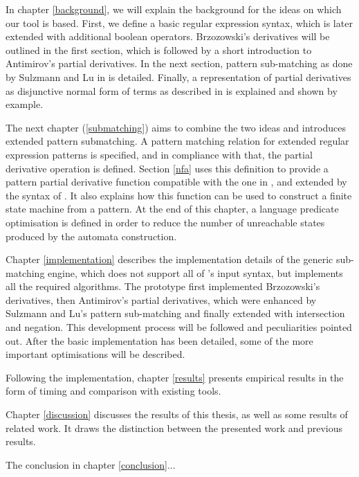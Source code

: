 In chapter \ref{background}, we will explain the background for the ideas on
which our tool is based. First, we define a basic regular expression syntax,
which is later extended with additional boolean operators. Brzozowski's
derivatives will be outlined in the first section, which is followed by a short
introduction to Antimirov's partial derivatives. In the next section, pattern
sub-matching as done by Sulzmann and Lu in \cite{pdpat} is detailed. Finally, a
representation of partial derivatives as disjunctive normal form of terms as
described in \cite{pdere} is explained and shown by example.

The next chapter (\ref{submatching}) aims to combine the two ideas and
introduces extended pattern submatching. A pattern matching relation for
extended regular expression patterns is specified, and in compliance with that,
the partial derivative operation is defined. Section \ref{nfa} uses this
definition to provide a pattern partial derivative function compatible with the
one in \cite{pdpat}, and extended by the syntax of \cite{pdere}. It also
explains how this function can be used to construct a finite state machine from
a pattern. At the end of this chapter, a language predicate optimisation is
defined in order to reduce the number of unreachable states produced by the
automata construction.

Chapter \ref{implementation} describes the implementation details of the generic
sub-matching engine, which does not support all of \reml's input syntax, but
implements all the required algorithms. The prototype first implemented
Brzozowski's derivatives, then Antimirov's partial derivatives, which were
enhanced by Sulzmann and Lu's pattern sub-matching and finally extended with
intersection and negation. This development process will be followed and
peculiarities pointed out. After the basic implementation has been detailed,
some of the more important optimisations will be described.

Following the implementation, chapter \ref{results} presents empirical results
in the form of timing and comparison with existing tools.

Chapter \ref{discussion} discusses the results of this thesis, as well as some
results of related work. It draws the distinction between the presented work and
previous results.

The conclusion in chapter \ref{conclusion}...


